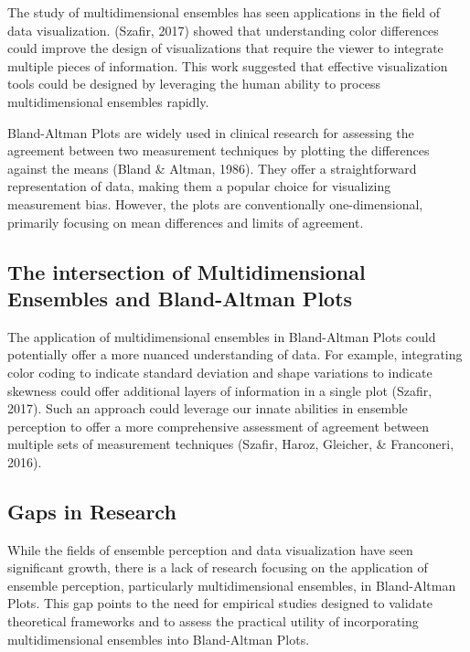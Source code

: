 \documentclass[print]{nuthesis}
\begin{document}
The study of multidimensional ensembles has seen applications in the field of data visualization.
(Szafir, 2017) showed that understanding color differences could improve the design of visualizations that require the viewer to integrate multiple pieces of information.
This work suggested that effective visualization tools could be designed by leveraging the human ability to process multidimensional ensembles rapidly.

Bland-Altman Plots are widely used in clinical research for assessing the agreement between two measurement techniques by plotting the differences against the means (Bland \& Altman, 1986).
They offer a straightforward representation of data, making them a popular choice for visualizing measurement bias.
However, the plots are conventionally one-dimensional, primarily focusing on mean differences and limits of agreement.

\hypertarget{the-intersection-of-multidimensional-ensembles-and-bland-altman-plots}{%
\subsection{The intersection of Multidimensional Ensembles and Bland-Altman Plots}\label{the-intersection-of-multidimensional-ensembles-and-bland-altman-plots}}

The application of multidimensional ensembles in Bland-Altman Plots could potentially offer a more nuanced understanding of data.
For example, integrating color coding to indicate standard deviation and shape variations to indicate skewness could offer additional layers of information in a single plot (Szafir, 2017).
Such an approach could leverage our innate abilities in ensemble perception to offer a more comprehensive assessment of agreement between multiple sets of measurement techniques (Szafir, Haroz, Gleicher, \& Franconeri, 2016).

\hypertarget{gaps-in-research}{%
\subsection{Gaps in Research}\label{gaps-in-research}}

While the fields of ensemble perception and data visualization have seen significant growth, there is a lack of research focusing on the application of ensemble perception, particularly multidimensional ensembles, in Bland-Altman Plots.
This gap points to the need for empirical studies designed to validate theoretical frameworks and to assess the practical utility of incorporating multidimensional ensembles into Bland-Altman Plots.
\end{document}
